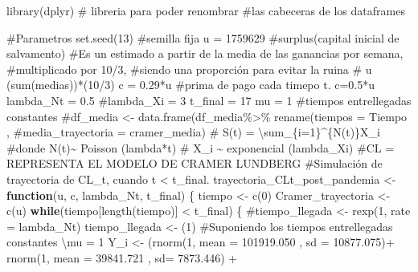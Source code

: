 \documentclass[
  us-letterpaper,
]{scrreprt}
\newenvironment{Shaded}{\begin{snugshade}}{\end{snugshade}}
\newcommand{\AttributeTok}[1]{\textcolor[rgb]{0.40,0.45,0.13}{#1}}
\newcommand{\CommentTok}[1]{\textcolor[rgb]{0.37,0.37,0.37}{#1}}
\newcommand{\ControlFlowTok}[1]{\textcolor[rgb]{0.00,0.23,0.31}{\textbf{#1}}}
\newcommand{\DecValTok}[1]{\textcolor[rgb]{0.68,0.00,0.00}{#1}}
\newcommand{\FloatTok}[1]{\textcolor[rgb]{0.68,0.00,0.00}{#1}}
\newcommand{\FunctionTok}[1]{\textcolor[rgb]{0.28,0.35,0.67}{#1}}
\newcommand{\NormalTok}[1]{\textcolor[rgb]{0.00,0.23,0.31}{#1}}
\newcommand{\OtherTok}[1]{\textcolor[rgb]{0.00,0.23,0.31}{#1}}
\newcommand{\SpecialCharTok}[1]{\textcolor[rgb]{0.37,0.37,0.37}{#1}}
\theoremstyle{definition}
\theoremstyle{plain}
\theoremstyle{plain}
\theoremstyle{remark}
\begin{document}
\begin{Shaded}
\begin{Highlighting}[]
\FunctionTok{library}\NormalTok{(dplyr) }\CommentTok{\# libreria para poder renombrar }
\CommentTok{\#las cabeceras de los dataframes}

\CommentTok{\#Parametros}
\FunctionTok{set.seed}\NormalTok{(}\DecValTok{13}\NormalTok{) }\CommentTok{\#semilla fija}
\NormalTok{u }\OtherTok{=} \DecValTok{1759629} \CommentTok{\#surplus(capital inicial de salvamento)}
\CommentTok{\#Es un estimado a partir de la media de las ganancias por semana, }
\CommentTok{\#multiplicado por 10/3, }
\CommentTok{\#siendo una proporción para evitar la ruina}
\CommentTok{\# u (sum(medias))*(10/3)}
\NormalTok{c }\OtherTok{=} \FloatTok{0.29}\SpecialCharTok{*}\NormalTok{u }\CommentTok{\#prima de pago cada timepo t. c=0.5*u}
\NormalTok{lambda\_Nt }\OtherTok{=} \FloatTok{0.5}
\CommentTok{\#lambda\_Xi = 3}
\NormalTok{t\_final }\OtherTok{=} \DecValTok{17}
\NormalTok{mu }\OtherTok{=} \DecValTok{1} \CommentTok{\#tiempos entrellegadas constantes}
\CommentTok{\#df\_media \textless{}{-} data.frame(df\_media\%\textgreater{}\% rename(tiempos = Tiempo ,}
\CommentTok{\#media\_trayectoria = cramer\_media)}
\CommentTok{\# S(t) = \textbackslash{}sum\_\{i=1\}\^{}\{N(t)\}X\_i}
\CommentTok{\#donde N(t)\textasciitilde{} Poisson (lambda*t)}
\CommentTok{\# X\_i \textasciitilde{} exponencial (lambda\_Xi)}
\CommentTok{\#CL = REPRESENTA EL MODELO DE CRAMER LUNDBERG}
\CommentTok{\#Simulación de trayectoria de CL\_t, cuando t \textless{} t\_final.}
\NormalTok{trayectoria\_CLt\_post\_pandemia }\OtherTok{\textless{}{-}} \ControlFlowTok{function}\NormalTok{(u, c, lambda\_Nt, t\_final)}
\NormalTok{\{}
\NormalTok{  tiempo }\OtherTok{\textless{}{-}} \FunctionTok{c}\NormalTok{(}\DecValTok{0}\NormalTok{)}
\NormalTok{  Cramer\_trayectoria }\OtherTok{\textless{}{-}} \FunctionTok{c}\NormalTok{(u)}
  \ControlFlowTok{while}\NormalTok{(tiempo[}\FunctionTok{length}\NormalTok{(tiempo)] }\SpecialCharTok{\textless{}}\NormalTok{ t\_final)}
\NormalTok{  \{}
    \CommentTok{\#tiempo\_llegada \textless{}{-} rexp(1, rate = lambda\_Nt)}
\NormalTok{    tiempo\_llegada }\OtherTok{\textless{}{-}}\NormalTok{ (}\DecValTok{1}\NormalTok{) }
\CommentTok{\#Suponiendo los tiempos entrellegadas constantes \textbackslash{}mu = 1}
\NormalTok{    Y\_i }\OtherTok{\textless{}{-}}\NormalTok{  (}\FunctionTok{rnorm}\NormalTok{(}\DecValTok{1}\NormalTok{, }\AttributeTok{mean =} \FloatTok{101919.050}\NormalTok{ , }\AttributeTok{sd =} \FloatTok{10877.075}\NormalTok{)}\SpecialCharTok{+} 
              \FunctionTok{rnorm}\NormalTok{(}\DecValTok{1}\NormalTok{, }\AttributeTok{mean =}  \FloatTok{39841.721}\NormalTok{ , }\AttributeTok{sd=} \FloatTok{7873.446}\NormalTok{) }\SpecialCharTok{+} 

\end{Highlighting}
\end{Shaded}
\end{document}
